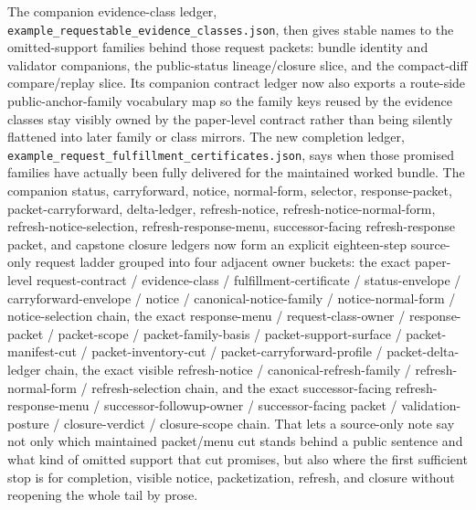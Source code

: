 \documentclass[11pt]{article}
\begin{document}
The companion evidence-class ledger, \texttt{example\_requestable\_evidence\_classes.json}, then gives stable names to the omitted-support families behind those request packets: bundle identity and validator companions, the public-status lineage/closure slice, and the compact-diff compare/replay slice. Its companion contract ledger now also exports a route-side public-anchor-family vocabulary map so the family keys reused by the evidence classes stay visibly owned by the paper-level contract rather than being silently flattened into later family or class mirrors. The new completion ledger, \texttt{example\_request\_fulfillment\_certificates.json}, says when those promised families have actually been fully delivered for the maintained worked bundle. The companion status, carryforward, notice, normal-form, selector, response-packet, packet-carryforward, delta-ledger, refresh-notice, refresh-notice-normal-form, refresh-notice-selection, refresh-response-menu, successor-facing refresh-response packet, and capstone closure ledgers now form an explicit eighteen-step source-only request ladder grouped into four adjacent owner buckets: the exact paper-level request-contract / evidence-class / fulfillment-certificate / status-envelope / carryforward-envelope / notice / canonical-notice-family / notice-normal-form / notice-selection chain, the exact response-menu / request-class-owner / response-packet / packet-scope / packet-family-basis / packet-support-surface / packet-manifest-cut / packet-inventory-cut / packet-carryforward-profile / packet-delta-ledger chain, the exact visible refresh-notice / canonical-refresh-family / refresh-normal-form / refresh-selection chain, and the exact successor-facing refresh-response-menu / successor-followup-owner / successor-facing packet / validation-posture / closure-verdict / closure-scope chain. That lets a source-only note say not only which maintained packet/menu cut stands behind a public sentence and what kind of omitted support that cut promises, but also where the first sufficient stop is for completion, visible notice, packetization, refresh, and closure without reopening the whole tail by prose.\cite{series:requestableevidenceclasses,series:requestfulfillmentcertificates,series:publicrequeststatusenvelopes,series:publicrequestcarryforward,series:publicrequestnotices,series:publicrequestnoticenormalforms,series:publicrequestnoticeselections,series:publicrequestresponsemenus,series:publicrequestresponsepackets,series:publicrequestresponsepacketcarryforward,series:publicrequestresponsepacketdeltas,series:publicrequestresponsepacketrefreshnotices,series:publicrequestresponsepacketrefreshnoticenormalforms,series:publicrequestresponsepacketrefreshnoticeselections,series:publicrequestresponsepacketrefreshresponsemenus,series:publicrequestresponsepacketrefreshresponsepackets,series:publicrequestresponsepacketrefreshresponsepacketclosureverdicts}
\end{document}
